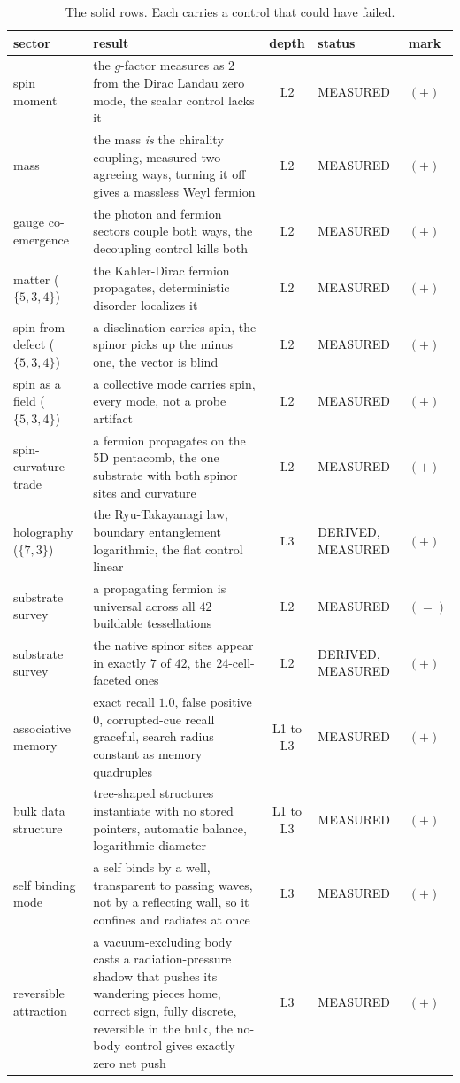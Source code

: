 \begin{table}[ht]
\centering
\small
\begin{tabular}{@{}p{3.0cm}p{6.4cm}cll@{}}
\toprule
sector & result & depth & status & mark \\
\midrule
spin moment & the $g$-factor measures as $2$ from the Dirac Landau zero mode, the scalar control lacks it & L2 & MEASURED & $(+)$ \\
mass & the mass \emph{is} the chirality coupling, measured two agreeing ways, turning it off gives a massless Weyl fermion & L2 & MEASURED & $(+)$ \\
gauge co-emergence & the photon and fermion sectors couple both ways, the decoupling control kills both & L2 & MEASURED & $(+)$ \\
matter ($\{5,3,4\}$) & the Kahler-Dirac fermion propagates, deterministic disorder localizes it & L2 & MEASURED & $(+)$ \\
spin from defect ($\{5,3,4\}$) & a disclination carries spin, the spinor picks up the minus one, the vector is blind & L2 & MEASURED & $(+)$ \\
spin as a field ($\{5,3,4\}$) & a collective mode carries spin, every mode, not a probe artifact & L2 & MEASURED & $(+)$ \\
spin-curvature trade & a fermion propagates on the 5D pentacomb, the one substrate with both spinor sites and curvature & L2 & MEASURED & $(+)$ \\
holography ($\{7,3\}$) & the Ryu-Takayanagi law, boundary entanglement logarithmic, the flat control linear & L3 & DERIVED, MEASURED & $(+)$ \\
substrate survey & a propagating fermion is universal across all $42$ buildable tessellations & L2 & MEASURED & $(=)$ \\
substrate survey & the native spinor sites appear in exactly $7$ of $42$, the $24$-cell-faceted ones & L2 & DERIVED, MEASURED & $(+)$ \\
associative memory & exact recall $1.0$, false positive $0$, corrupted-cue recall graceful, search radius constant as memory quadruples & L1 to L3 & MEASURED & $(+)$ \\
bulk data structure & tree-shaped structures instantiate with no stored pointers, automatic balance, logarithmic diameter & L1 to L3 & MEASURED & $(+)$ \\
self binding mode & a self binds by a well, transparent to passing waves, not by a reflecting wall, so it confines and radiates at once & L3 & MEASURED & $(+)$ \\
reversible attraction & a vacuum-excluding body casts a radiation-pressure shadow that pushes its wandering pieces home, correct sign, fully discrete, reversible in the bulk, the no-body control gives exactly zero net push & L3 & MEASURED & $(+)$ \\
\bottomrule
\end{tabular}
\caption{The solid rows. Each carries a control that could have failed.}
\label{tab:solid}
\end{table}

